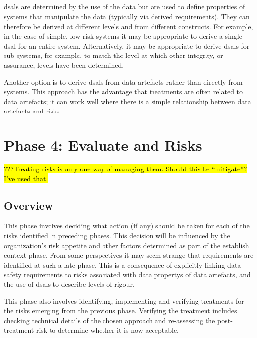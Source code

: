 \subsection{}\label{bkm:activities:analyse:tailoring}
\glspl{dsal} are determined by the use of the data but are used to define properties of systems that manipulate the data (typically via derived requirements). They can therefore be derived at different levels and from different constructs. For example, in the case of simple, low-risk systems it may be appropriate to derive a single \gls{dsal} for an entire system. Alternatively, it may be appropriate to derive \glspl{dsal} for sub-systems, for example, to match the level at which other \gls{integrity}, or assurance, levels have been determined.

Another option is to derive \glspl{dsal} from \glspl{data artefact} rather than directly from systems. This approach has the advantage that \glspl{treatment} are often related to \glspl{data artefact}; it can work well where there is a simple relationship between \glspl{data artefact} and risks.

\section{Phase 4: Evaluate and  Risks}
\hl{???Treating risks is only one way of managing them. Should this be ``mitigate''? I've used that.}
\subsection{Overview}
This phase involves deciding what action (if any) should be taken for each of the risks identified in preceding phases. This decision will be influenced by the organization's risk appetite and other factors determined as part of the establish context phase. From some perspectives it may seem strange that requirements are identified at such a late phase. This is a consequence of explicitly linking data safety requirements to risks associated with \glspl{data property} of \glspl{data artefact}, and the use of \glspl{dsal} to describe levels of rigour. 

This phase also involves identifying, implementing and verifying \glspl{treatment} for the risks emerging from the previous phase. Verifying the \gls{treatment} includes checking technical details of the chosen approach and re-assessing the post-\gls{treatment} risk to determine whether it is now acceptable.


